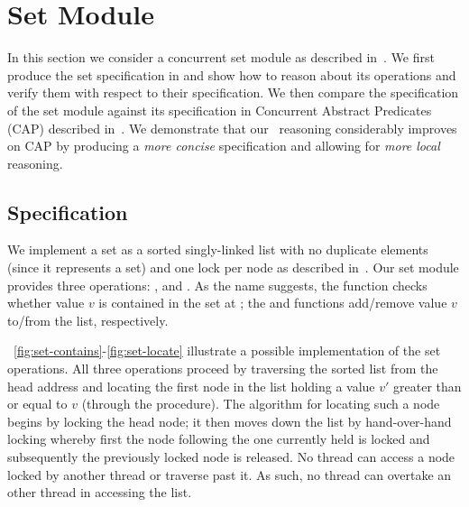 \clearpage\section{Set Module}\label{sec:set-example}
In this section we consider a concurrent set module as described in~\cite{cap-ecoop10}. We first produce the set specification in \colosl and show how to reason about its operations and verify them with respect to their specification. We then compare the \colosl specification of the set module against its specification in Concurrent Abstract Predicates (CAP) described in~\cite{cap-ecoop10}. We demonstrate that our \colosl\ reasoning considerably improves on CAP by producing a \emph{more concise} specification and allowing for \emph{more local} reasoning. 

\subsection*{\colosl Specification}
We implement a set as a sorted singly-linked list with no duplicate elements (since it represents a set) and one lock per node as described in~\cite{cap-ecoop10}. Our set module provides three operations: ,  and .
As the name suggests, the  function checks whether value $v$ is contained in the set at ; the  and  functions add/remove value $v$ to/from the list, respectively.

\fig~\ref{fig:set-contains}-\ref{fig:set-locate} illustrate a possible implementation of the set operations. All three operations proceed by traversing the sorted list from the head address and locating the first node in the list holding a value $v'$ greater than or equal to $v$ (through the  procedure). The algorithm for locating such a node begins by locking the head node; it then moves down the list by hand-over-hand locking whereby first the node following the one currently held is locked and subsequently the previously locked node is released. No thread can access a node locked by another thread or traverse past it. As such, no thread can overtake an other thread in accessing the list. 
%


%


